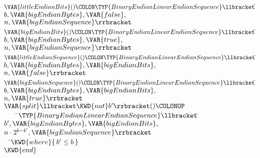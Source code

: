 \begin{Fortress}
\(  \VAR{littleEndianBits}()\COLON \TYP{BinaryEndianLinearEndianSequence}\llbracket\null\)\pushtabs\=\+\(b,\VAR{bigEndianBytes},\VAR{false},\)\\
\(                                                        n,\VAR{bigEndianSequence}\rrbracket\)\-\\\poptabs
\(  \VAR{bigEndianBits}()\COLON \TYP{BinaryEndianLinearEndianSequence}\llbracket\null\)\pushtabs\=\+\(b,\VAR{bigEndianBytes},\VAR{true},\)\\
\(                                                     n,\VAR{bigEndianSequence}\rrbracket\)\-\\\poptabs
\(  \VAR{littleEndianSequence}()\COLON \TYP{BinaryEndianLinearEndianSequence}\llbracket\null\)\pushtabs\=\+\(b,\VAR{bigEndianBytes},\VAR{bigEndianBits},\)\\
\(                                                            n,\VAR{false}\rrbracket\)\-\\\poptabs
\(  \VAR{bigEndianSequence}()\COLON \TYP{BinaryEndianLinearEndianSequence}\llbracket\null\)\pushtabs\=\+\(b,\VAR{bigEndianBytes},\VAR{bigEndianBits},\)\\
\(                                                         n,\VAR{true}\rrbracket\)\-\\\poptabs
\(  \VAR{split}\llbracket\KWD{nat} b'\rrbracket()\COLONOP\)\\
{\tt~~~~}\pushtabs\=\+\(      \TYP{BinaryEndianLinearEndianSequence}\llbracket\null\)\pushtabs\=\+\(b',\VAR{bigEndianBytes},\VAR{bigEndianBits},\)\\
\(                                        n \cdot 2^{b-b'},\VAR{bigEndianSequence}\rrbracket\)\-\-\\\poptabs\poptabs
{\tt~~}\pushtabs\=\+\(    \KWD{where} \{\,b' \leq b\,\}\)\-\-\\\poptabs\poptabs
\(\KWD{end}\)
\end{Fortress}



